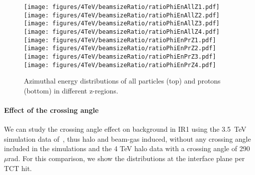 \begin{figure}%
\begin{center}
  \texttt{[image: figures/4TeV/beamsizeRatio/ratioPhiEnAllZ1.pdf]}
  \texttt{[image: figures/4TeV/beamsizeRatio/ratioPhiEnAllZ2.pdf]}
  \texttt{[image: figures/4TeV/beamsizeRatio/ratioPhiEnAllZ3.pdf]}
  \texttt{[image: figures/4TeV/beamsizeRatio/ratioPhiEnAllZ4.pdf]}
  \texttt{[image: figures/4TeV/beamsizeRatio/ratioPhiEnPrZ1.pdf]}
  \texttt{[image: figures/4TeV/beamsizeRatio/ratioPhiEnPrZ2.pdf]}
  \texttt{[image: figures/4TeV/beamsizeRatio/ratioPhiEnPrZ3.pdf]}
  \texttt{[image: figures/4TeV/beamsizeRatio/ratioPhiEnPrZ4.pdf]}
\end{center}
\vspace{-0.6cm}
 \caption{Azimuthal energy distributions of all particles (top) and protons (bottom) in different z-regions.
  \label{bsZ}}
\end{figure}

 
\paragraph{Effect of the crossing angle}

We can study the crossing angle effect on background in IR1 using the 3.5~TeV simulation data of~\cite{nimPaperRod}, thus halo and beam-gas induced, without any crossing angle included in the simulations and the 4 TeV halo data with a crossing angle of 290~$\mu$rad. For this comparison, we show the distributions at the interface plane per TCT hit. 

